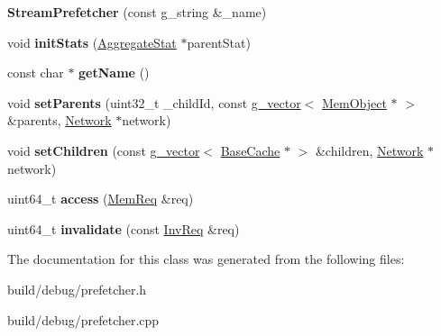 \begin{DoxyCompactItemize}
\item 
\hypertarget{classStreamPrefetcher_a970f74b76edd89ed0211ada9df24b119}{{\bfseries Stream\-Prefetcher} (const g\-\_\-string \&\-\_\-name)}\label{classStreamPrefetcher_a970f74b76edd89ed0211ada9df24b119}

\item 
\hypertarget{classStreamPrefetcher_ad0a16eed87db01ffcbc42a45824e65fb}{void {\bfseries init\-Stats} (\hyperlink{classAggregateStat}{Aggregate\-Stat} $\ast$parent\-Stat)}\label{classStreamPrefetcher_ad0a16eed87db01ffcbc42a45824e65fb}

\item 
\hypertarget{classStreamPrefetcher_a521ea99034db4504d9a19df50394a885}{const char $\ast$ {\bfseries get\-Name} ()}\label{classStreamPrefetcher_a521ea99034db4504d9a19df50394a885}

\item 
\hypertarget{classStreamPrefetcher_a662f4df26d0af098250b021c4fb69ebf}{void {\bfseries set\-Parents} (uint32\-\_\-t \-\_\-child\-Id, const \hyperlink{classg__vector}{g\-\_\-vector}$<$ \hyperlink{classMemObject}{Mem\-Object} $\ast$ $>$ \&parents, \hyperlink{classNetwork}{Network} $\ast$network)}\label{classStreamPrefetcher_a662f4df26d0af098250b021c4fb69ebf}

\item 
\hypertarget{classStreamPrefetcher_a4480f864cc0e916041f3aba6a2e38be9}{void {\bfseries set\-Children} (const \hyperlink{classg__vector}{g\-\_\-vector}$<$ \hyperlink{classBaseCache}{Base\-Cache} $\ast$ $>$ \&children, \hyperlink{classNetwork}{Network} $\ast$network)}\label{classStreamPrefetcher_a4480f864cc0e916041f3aba6a2e38be9}

\item 
\hypertarget{classStreamPrefetcher_a0e2d09fc748974655cdd3b23591d0f9b}{uint64\-\_\-t {\bfseries access} (\hyperlink{structMemReq}{Mem\-Req} \&req)}\label{classStreamPrefetcher_a0e2d09fc748974655cdd3b23591d0f9b}

\item 
\hypertarget{classStreamPrefetcher_a7c1cce2c7be8f10bec474b943765da71}{uint64\-\_\-t {\bfseries invalidate} (const \hyperlink{structInvReq}{Inv\-Req} \&req)}\label{classStreamPrefetcher_a7c1cce2c7be8f10bec474b943765da71}

\end{DoxyCompactItemize}


The documentation for this class was generated from the following files\-:\begin{DoxyCompactItemize}
\item 
build/debug/prefetcher.\-h\item 
build/debug/prefetcher.\-cpp\end{DoxyCompactItemize}
